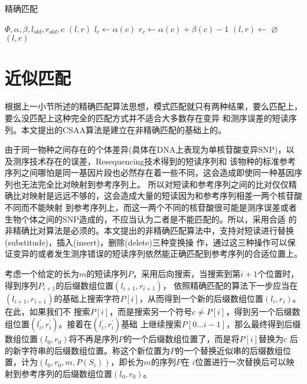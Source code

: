 \begin{algorithm}
    \caption{精确匹配}
    \label{alg:exac}
    \begin{algorithmic}[1]
        \Require $\Phi,\alpha,\beta,l_{old},r_{old},c$
        \Ensure $(l,r)$
        \State $l_c \gets \alpha(c)$
        \State $r_c \gets \alpha(c)+\beta(c)-1$
        \State $(l,r) \gets $
            \State \Return $\varnothing$
        \Else
            \State \Return $(l,r)$
        \EndIf
        \EndFunction
    \end{algorithmic}
\end{algorithm}

\section{近似匹配}

根据上一小节所述的精确匹配算法思想，模式匹配就只有两种结果，要么匹配上，要么没匹配上这种完全的匹配方式并不适合大多数存在变异
和测序误差的短读序列。本文提出的CSAA算法是建立在非精确匹配的基础上的。

由于同一物种之间存在的个体差异(具体在DNA上表现为单核苷酸变异SNP)，以及测序技术存在的误差，Resequencing技术得到的短读序列和
该物种的标准参考序列之间哪怕是同一基因片段也必然存在着一些不同，这会造成即使同一种基因序列也无法完全比对映射到参考序列上。
所以对短读和参考序列之间的比对仅仅精确比对映射是远远不够的，这会造成大量的短读因为和参考序列相差一两个核苷酸不同而不能映射
到参考序列上，而这一两个不同的核苷酸很可能是测序误差或者生物个体之间的SNP造成的，不应当认为二者是不能匹配的。所以，采用合适
的非精确比对算法是必须的。本文提出的非精确匹配算法中，支持对短读进行替换(substitude)，插入(insert)，删除(delete)三种变换操
作，通过这三种操作可以保证变异的或者发生测序错误的短读序列依然能正确匹配到参考序列的合适位置上。

考虑一个给定的长为$m$的短读序列$P$，采用后向搜索，当搜索到第$i+1$个位置时，得到序列$P_{i+1}$的后缀数组位置$(l_{i+1},r_{i+1})$，
依照精确匹配的算法下一步应当在$(l_{i+1},r_{i+1})$的基础上搜索字符$P[i]$，从而得到一个新的后缀数组位置$(l_i,r_i)$。在此，如果我们不
搜索$P[i]$，而是搜索另一个符号$c \neq P[i]$，得到另一个后缀数组位置$(l_{i}^{'},r_{i}^{'})$。接着在$(l_{i}^{'},r_{i}^{'})$基础
上继续搜索$P[0\ldots i-1]$，那么最终得到后缀数组位置$(l_0,r_0)$将不再是序列$P$的一个后缀数组位置了，而是将$P[i]$替换为$c$
后的新字符串的后缀数组位置。称这个新位置为$P$的一个替换近似串的后缀数组位置，计为$(l_0,r_0,m,P(S_i))$，即长为$m$的序列$P$在
$i$位置进行一次替换后可以映射到参考序列的后缀数组位置$(l_0,r_0)$。

